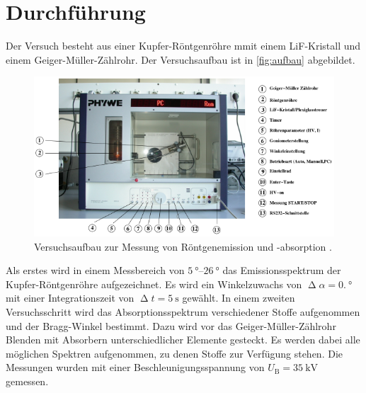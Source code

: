 \section{Durchführung}
\label{sec:Durchführung}
Der Versuch besteht aus einer Kupfer-Röntgenröhre mmit einem LiF-Kristall und einem Geiger-Müller-Zählrohr.
Der Versuchsaufbau ist in \autoref{fig:aufbau} abgebildet.
\begin{figure}[H]
    \centering
    \includegraphics[width = 0.7 \textwidth]{data/aufbau.png}
    \caption{Versuchsaufbau zur Messung von Röntgenemission und -absorption \cite{Anleitung602}.}
    \label{fig:aufbau}
\end{figure}
Als erstes wird in einem Messbereich von $\SIrange{5}{26}{\degree}$ das Emissionsspektrum der Kupfer-Röntgenröhre aufgezeichnet. Es wird ein Winkelzuwachs von 
$\upDelta \alpha = \SI{0,}{\degree}$ mit einer Integrationszeit von $\upDelta t=\SI{5}{\second}$ gewählt. \newline
In einem zweiten Versuchsschritt wird das Absorptionsspektrum verschiedener Stoffe aufgenommen und der Bragg-Winkel bestimmt.
Dazu wird vor das Geiger-Müller-Zählrohr Blenden mit Absorbern unterschiedlicher Elemente gesteckt. Es werden dabei alle möglichen Spektren aufgenommen, zu denen Stoffe zur Verfügung stehen.
Die Messungen wurden mit einer Beschleunigungsspannung von $U_{\text{B}} = \SI{35}{\kilo\volt}$ gemessen.